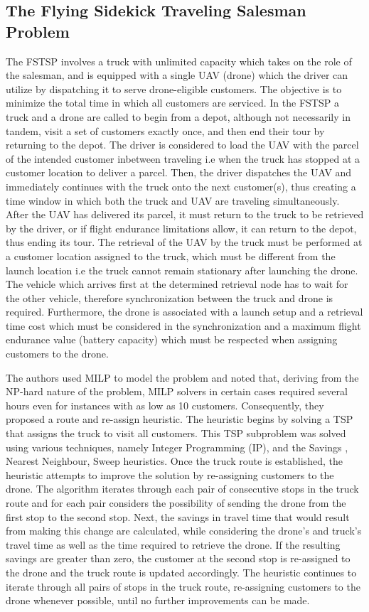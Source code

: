 \documentclass{article}
\begin{document}
	\subsection{The Flying Sidekick Traveling Salesman Problem} 
	The FSTSP involves a truck with unlimited capacity which takes on the role of the salesman, and is equipped with a single UAV (drone) which the driver can utilize by dispatching it to serve drone-eligible customers. The objective is to minimize the total time in which all customers are serviced.
	In the FSTSP a truck and a drone are called to begin from a depot, although not necessarily in tandem, visit a set of customers exactly once, and then end their tour by returning to the depot. The driver is considered to load the UAV with the parcel of the intended customer inbetween traveling i.e when the truck has stopped at a customer location to deliver a parcel. Then, the driver dispatches the UAV and immediately continues with the truck onto the next customer(s), thus creating a time window in which both the truck and UAV are traveling simultaneously. After the UAV has delivered its parcel, it must return to the truck to be retrieved by the driver, or if flight endurance limitations allow, it can return to the depot, thus ending its tour. The retrieval of the UAV by the truck must be performed at a customer location assigned to the truck, which must be different from the launch location i.e the truck cannot remain stationary after launching the drone. The vehicle which arrives first at the determined retrieval node has to wait for the other vehicle, therefore synchronization between the truck and drone is required. Furthermore, the drone is associated with a launch setup and a retrieval time cost which must be considered in the synchronization and a maximum flight endurance value (battery capacity) which must be respected when assigning customers to the drone.
	\par
	The authors used MILP to model the problem and noted that, deriving from the NP-hard nature of the problem, MILP solvers in certain cases required several hours even for instances with as low as 10 customers. Consequently, they proposed a route and re-assign heuristic. The heuristic begins by solving a TSP that assigns the truck to visit all customers. This TSP subproblem was solved using various techniques, namely Integer Programming (IP), and the \citeauthor{CW1964} Savings \cite{CW1964}, Nearest Neighbour, Sweep heuristics. Once the truck route is established, the heuristic attempts to improve the solution by re-assigning customers to the drone. The algorithm iterates through each pair of consecutive stops in the truck route and for each pair considers the possibility of sending the drone from the first stop to the second stop. Next, the savings in travel time that would result from making this change are calculated, while considering the drone's and truck's travel time as well as the time required to retrieve the drone. If the resulting savings are greater than zero, the customer at the second stop is re-assigned to the drone and the truck route is updated accordingly. The heuristic continues to iterate through all pairs of stops in the truck route, re-assigning customers to the drone whenever possible, until no further improvements can be made. 
\end{document}
